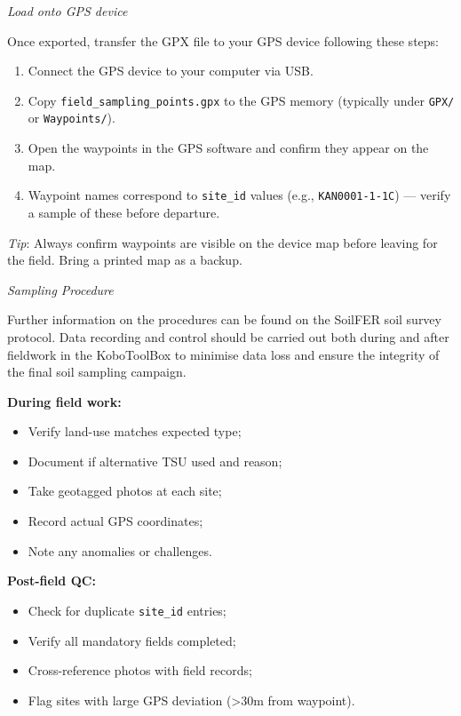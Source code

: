 \documentclass[
  10pt,
  b5paper,
  oneside]{book}
\providecommand{\tightlist}{%
  \setlength{\itemsep}{0pt}\setlength{\parskip}{0pt}}
\begin{document}
\emph{Load onto GPS device}

Once exported, transfer the GPX file to your GPS device following these steps:

\begin{enumerate}
\def\labelenumi{\arabic{enumi}.}
\tightlist
\item
  Connect the GPS device to your computer via USB.
\item
  Copy \texttt{field\_sampling\_points.gpx} to the GPS memory (typically under \texttt{GPX/} or \texttt{Waypoints/}).
\item
  Open the waypoints in the GPS software and confirm they appear on the map.
\item
  Waypoint names correspond to \texttt{site\_id} values (e.g., \texttt{KAN0001-1-1C}) --- verify a sample of these before departure.
\end{enumerate}

\emph{Tip}: Always confirm waypoints are visible on the device map before leaving for the field. Bring a printed map as a backup.

\emph{Sampling Procedure}

Further information on the procedures can be found on the SoilFER soil survey protocol. Data recording and control should be carried out both during and after fieldwork in the KoboToolBox to minimise data loss and ensure the integrity of the final soil sampling campaign.

\textbf{During field work:}

\begin{itemize}
\item
  Verify land-use matches expected type;
\item
  Document if alternative TSU used and reason;
\item
  Take geotagged photos at each site;
\item
  Record actual GPS coordinates;
\item
  Note any anomalies or challenges.
\end{itemize}

\textbf{Post-field QC:}

\begin{itemize}
\item
  Check for duplicate \texttt{site\_id} entries;
\item
  Verify all mandatory fields completed;
\item
  Cross-reference photos with field records;
\item
  Flag sites with large GPS deviation (\textgreater30m from waypoint).
\end{itemize}
\end{document}
